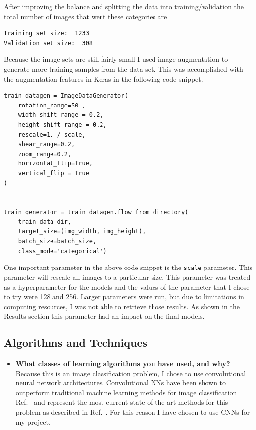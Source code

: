 \documentclass[10pt,a4paper]{article}
\begin{document}
After improving the balance and splitting the data into training/validation the total number of images that went these categories are 
\begin{lstlisting}
Training set size:  1233
Validation set size:  308
\end{lstlisting}
Because the image sets are still fairly small I used image augmentation to generate more training samples from the data set. This was accomplished with the augmentation features in Keras in the following code snippet.

\begin{lstlisting}
train_datagen = ImageDataGenerator(
    rotation_range=50.,
    width_shift_range = 0.2,
    height_shift_range = 0.2,
    rescale=1. / scale,
    shear_range=0.2,
    zoom_range=0.2,
    horizontal_flip=True,
    vertical_flip = True
)


train_generator = train_datagen.flow_from_directory(
    train_data_dir,
    target_size=(img_width, img_height),
    batch_size=batch_size,
    class_mode='categorical')
\end{lstlisting}

One important parameter in the above code snippet is the \lstinline{scale} parameter. This parameter will rescale all images to a particular size. This parameter was treated as a hyperparameter for the models and the values of the parameter that I chose to try were 128 and 256. Larger parameters were run, but due to limitations in computing resources, I was not able to retrieve those results. As shown in the Results section this parameter had an impact on the final models.

\newpage
\subsection{Algorithms and Techniques}
%

\begin{itemize}
\item {\bf What classes of learning algorithms you have used, and why?}\\
Because this is an image classification problem, I chose to use convolutional neural network architectures.
Convolutional NNs have been shown to outperform traditional machine learning methods for image classification Ref.~\cite{Krizhevsky_2012} and represent the most current state-of-the-art methods for this problem as described in Ref.~\cite{Russakovsky_2015}. For this reason I have chosen to use CNNs for my project.
\end{itemize}
\end{document}
